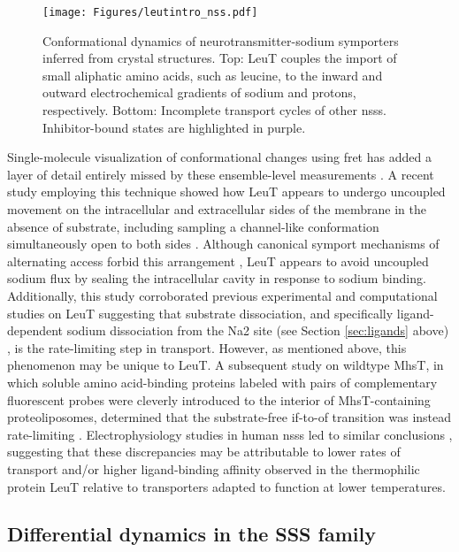 \begin{figure}[H]
\centering
\texttt{[image: Figures/leutintro\_nss.pdf]}
 \caption[Conformational dynamics of neurotransmitter-sodium symporters inferred from crystal structures.]{Conformational dynamics of neurotransmitter-sodium symporters inferred from crystal structures. Top: LeuT couples the import of small aliphatic amino acids, such as leucine, to the inward and outward electrochemical gradients of sodium and protons, respectively. Bottom: Incomplete transport cycles of other \gls{nss}s. Inhibitor-bound states are highlighted in purple.}
\label{fig:leutintro_nss}
\end{figure}

Single-molecule visualization of conformational changes using \gls{fret} has added a layer of detail entirely missed by these ensemble-level measurements \citep*{Juette2014, Schuler2013}. A recent study employing this technique showed how LeuT appears to undergo uncoupled movement on the intracellular and extracellular sides of the membrane in the absence of substrate, including sampling a channel-like conformation simultaneously open to both sides \citep*{Terry2018}. Although canonical symport mechanisms of alternating access forbid this arrangement \citep*{Forrest2009}, LeuT appears to avoid uncoupled sodium flux by sealing the intracellular cavity in response to sodium binding. Additionally, this study corroborated previous experimental and computational studies on LeuT suggesting that substrate dissociation, and specifically ligand-dependent sodium dissociation from the Na2 site (see Section \ref{sec:ligands} above) \citep*{Billesbølle2015, Razavi2018}, is the rate-limiting step in transport. However, as mentioned above, this phenomenon may be unique to LeuT. A subsequent study on wildtype MhsT, in which soluble amino acid-binding proteins labeled with pairs of complementary fluorescent probes were cleverly introduced to the interior of MhsT-containing proteoliposomes, determined that the substrate-free \gls{if}-to-\gls{of} transition was instead rate-limiting \citep*{Fitzgerald2019}. Electrophysiology studies in human \gls{nss}s led to similar conclusions \citep*{Bhat2021}, suggesting that these discrepancies may be attributable to lower rates of transport and/or higher ligand-binding affinity observed in the thermophilic protein LeuT relative to transporters adapted to function at lower temperatures. 

\subsection{Differential dynamics in the SSS family}

